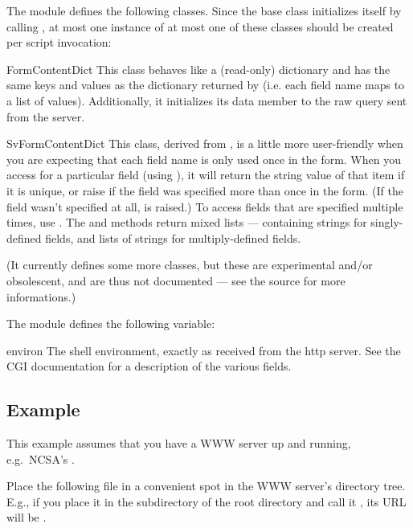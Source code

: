 The module defines the following classes.  Since the base class
initializes itself by calling , at most one instance of
at most one of these classes should be created per script invocation:

\begin{funcdesc}{FormContentDict}{}
This class behaves like a (read-only) dictionary and has the same keys
and values as the dictionary returned by  (i.e. each
field name maps to a list of values).  Additionally, it initializes
its data member  to the raw query sent from the
server.
\end{funcdesc}

\begin{funcdesc}{SvFormContentDict}{}
This class, derived from , is a little more
user-friendly when you are expecting that each field name is only used
once in the form.  When you access for a particular field (using
), it will return the string value of that item
if it is unique, or raise  if the field was specified
more than once in the form.  (If the field wasn't specified at all,
 is raised.)  To access fields that are specified
multiple times, use .  The
 and  methods return mixed lists ---
containing strings for singly-defined fields, and lists of strings for
multiply-defined fields.
\end{funcdesc}

(It currently defines some more classes, but these are experimental
and/or obsolescent, and are thus not documented --- see the source for
more informations.)

The module defines the following variable:

\begin{datadesc}{environ}
The shell environment, exactly as received from the http server.  See
the CGI documentation for a description of the various fields.
\end{datadesc}

\subsection{Example}

This example assumes that you have a WWW server up and running,
e.g.\ NCSA's .

Place the following file in a convenient spot in the WWW server's
directory tree.  E.g., if you place it in the subdirectory 
of the root directory and call it , its URL will be
.

